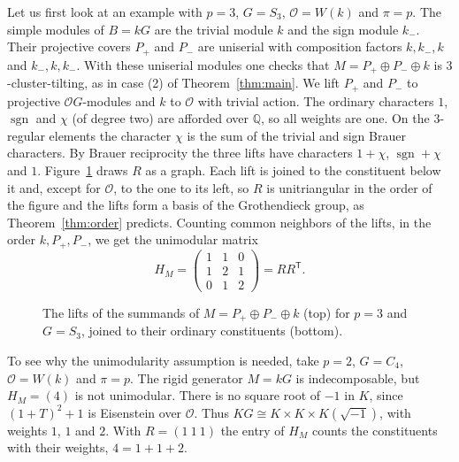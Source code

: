 \documentclass[11pt,a4paper,reqno]{amsart}
\newcommand{\kk}{k}
\theoremstyle{definition}
\newcommand{\OO}{\mathcal O}
\begin{document}
Let us first look at an example with $p=3$, $G=S_{3}$, $\OO=W(\kk)$
and $\pi=p$.  The simple modules of $B=\kk G$ are the trivial module
$\kk$ and the sign module $\kk_{-}$.  Their projective covers $P_{+}$
and $P_{-}$ are uniserial with composition factors $\kk,\kk_{-},\kk$
and $\kk_{-},\kk,\kk_{-}$.  With these uniserial modules one checks
that $M=P_{+}\oplus P_{-}\oplus\kk$ is $3$-cluster-tilting, as in case
(2) of Theorem~\ref{thm:main}.  We lift $P_{+}$ and $P_{-}$ to
projective $\OO G$-modules and $\kk$ to $\OO$ with trivial action.
The ordinary characters $1$, $\operatorname{sgn}$ and $\chi$ (of
degree two) are afforded over $\mathbb Q$, so all weights are one.  On
the $3$-regular elements the character $\chi$ is the sum of the
trivial and sign Brauer characters.  By Brauer reciprocity the three
lifts have characters $1+\chi$, $\operatorname{sgn}+\chi$ and $1$.
Figure~\ref{fig:s3} draws $R$ as a graph.  Each lift is joined to the
constituent below it and, except for $\OO$, to the one to its left, so
$R$ is unitriangular in the order of the figure and the lifts form a
basis of the Grothendieck group, as Theorem~\ref{thm:order} predicts.
Counting common neighbors of the lifts, in the order
$\kk,P_{+},P_{-}$, we get the unimodular matrix
%
\begin{equation*}
  H_{M}=\begin{pmatrix}1&1&0\\1&2&1\\0&1&2\end{pmatrix}=RR^{\mathsf T}.
\end{equation*}

\begin{figure}[ht]
  \centering
  \caption{The lifts of the summands of $M=P_{+}\oplus P_{-}\oplus\kk$
    (top) for $p=3$ and $G=S_{3}$, joined to their ordinary
    constituents (bottom).}
  \label{fig:s3}
\end{figure}

To see why the unimodularity assumption is needed, take $p=2$,
$G=C_{4}$, $\OO=W(\kk)$ and $\pi=p$.  The rigid generator $M=\kk G$ is
indecomposable, but $H_{M}=(4)$ is not unimodular.  There is no square
root of $-1$ in $K$, since $(1+T)^{2}+1$ is Eisenstein over $\OO$.
Thus $KG\cong K\times K\times K(\sqrt{-1})$, with weights $1$, $1$ and
$2$.  With $R=(1\ 1\ 1)$ the entry of $H_{M}$ counts the constituents
with their weights, $4=1+1+2$.
\end{document}
